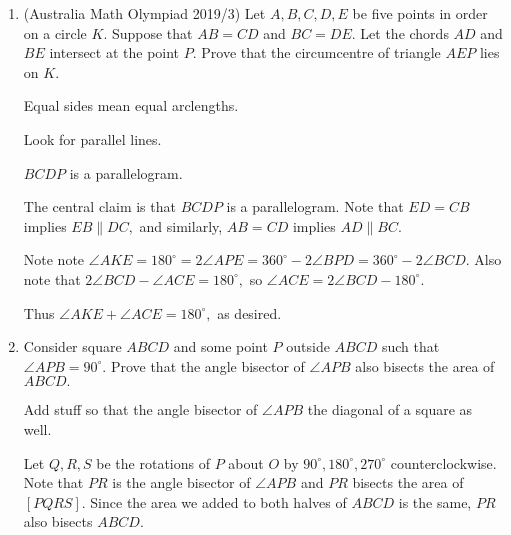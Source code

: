 \begin{enumerate}
\item (Australia Math Olympiad 2019/3) Let $A,B,C,D,E$ be five points in order on a circle $K$. Suppose that $AB = CD$ and $BC = DE$. Let the chords $AD$ and $BE$ intersect at the point $P$. Prove that the circumcentre of triangle $AEP$ lies on $K$.
\begin{hint}
\begin{addhint}
{Equal sides mean equal arclengths.}
\end{addhint}
\begin{addhint}
{Look for parallel lines.}
\end{addhint}
\begin{addhint}
{$BCDP$ is a parallelogram.}
\end{addhint}
\end{hint}
\begin{solu}
\begin{addsol}
{The central claim is that $BCDP$ is a parallelogram. Note that $ED=CB$ implies $EB\parallel DC,$ and similarly, $AB=CD$ implies $AD\parallel BC.$

Note note $\angle AKE=180^{\circ}=2\angle APE=360^{\circ}-2\angle BPD=360^{\circ}-2\angle BCD.$ Also note that $2\angle BCD-\angle ACE=180^{\circ},$ so $\angle ACE=2\angle BCD-180^{\circ}.$

Thus $\angle AKE+\angle ACE=180^{\circ},$ as desired.}
\end{addsol}
\end{solu}

\item Consider square $ABCD$ and some point $P$ outside $ABCD$ such that $\angle APB=90^{\circ}.$ Prove that the angle bisector of $\angle APB$ also bisects the area of $ABCD.$
\begin{hint}
\begin{addhint}
{Add stuff so that the angle bisector of $\angle APB$ the diagonal of a square as well.}
\end{addhint}
\end{hint}
\begin{solu}
\begin{addsol}
{Let $Q,R,S$ be the rotations of $P$ about $O$ by $90^{\circ},180^{\circ},270^{\circ}$ counterclockwise. Note that $PR$ is the angle bisector of $\angle APB$ and $PR$ bisects the area of $[PQRS].$ Since the area we added to both halves of $ABCD$ is the same, $PR$ also bisects $ABCD.$

}
\end{addsol}
\end{solu}
\end{enumerate}
